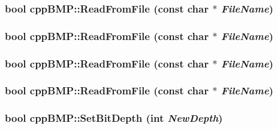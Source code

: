 \hypertarget{classcpp_b_m_p_b6b3269e3dc09cc5a9650578d5f5aa45}{
\subsubsection[{ReadFromFile}]{\setlength{\rightskip}{0pt plus 5cm}bool cppBMP::ReadFromFile (const char $\ast$ {\em FileName})}}
\label{classcpp_b_m_p_b6b3269e3dc09cc5a9650578d5f5aa45}


\hypertarget{classcpp_b_m_p_b6b3269e3dc09cc5a9650578d5f5aa45}{
\subsubsection[{ReadFromFile}]{\setlength{\rightskip}{0pt plus 5cm}bool cppBMP::ReadFromFile (const char $\ast$ {\em FileName})}}
\label{classcpp_b_m_p_b6b3269e3dc09cc5a9650578d5f5aa45}


\hypertarget{classcpp_b_m_p_b6b3269e3dc09cc5a9650578d5f5aa45}{
\subsubsection[{ReadFromFile}]{\setlength{\rightskip}{0pt plus 5cm}bool cppBMP::ReadFromFile (const char $\ast$ {\em FileName})}}
\label{classcpp_b_m_p_b6b3269e3dc09cc5a9650578d5f5aa45}


\hypertarget{classcpp_b_m_p_b6b3269e3dc09cc5a9650578d5f5aa45}{
\subsubsection[{ReadFromFile}]{\setlength{\rightskip}{0pt plus 5cm}bool cppBMP::ReadFromFile (const char $\ast$ {\em FileName})}}
\label{classcpp_b_m_p_b6b3269e3dc09cc5a9650578d5f5aa45}


\hypertarget{classcpp_b_m_p_4929652b47f073d3519b07fc05ed9eab}{
\subsubsection[{SetBitDepth}]{\setlength{\rightskip}{0pt plus 5cm}bool cppBMP::SetBitDepth (int {\em NewDepth})}}
\label{classcpp_b_m_p_4929652b47f073d3519b07fc05ed9eab}


